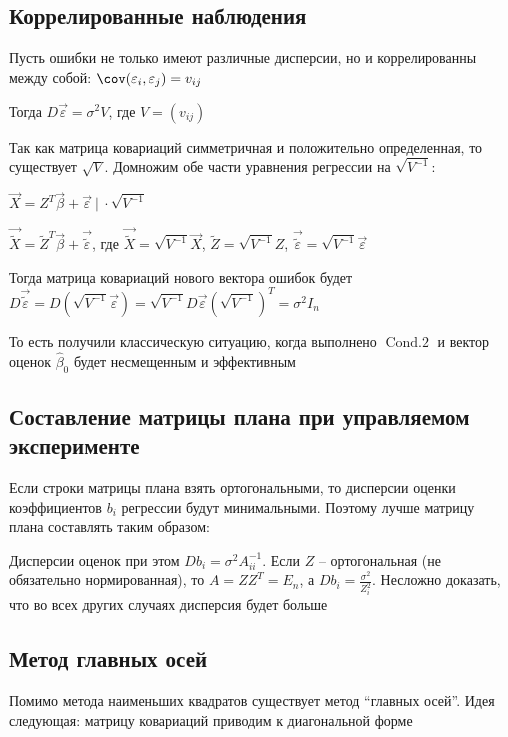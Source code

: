 \subsection{Коррелированные наблюдения}

Пусть ошибки не только имеют различные дисперсии, но и коррелированны между собой: $\cov (\varepsilon_i, \varepsilon_j) = v_{ij}$

Тогда $D \vec \varepsilon = \sigma^2 V$, где $V = \left(v_{ij}\right)$

Так как матрица ковариаций симметричная и положительно определенная, то существует $\sqrt{V}$. Домножим обе части уравнения регрессии на $\sqrt{V^{-1}}$:

$\vec X = Z^T \vec{\beta} + \vec \varepsilon \ \Big| \ \cdot \sqrt{V^{-1}}$

$\vec \tilde{X} = \tilde Z^T \vec \beta + \vec \tilde{\varepsilon}$, где $\vec \tilde{X} = \sqrt{V^{-1}} \vec X$, $\tilde Z = \sqrt{V^{-1}} Z$, $\vec \tilde{\varepsilon} = \sqrt{V^{-1}} \vec \varepsilon$

Тогда матрица ковариаций нового вектора ошибок будет $D \vec \tilde{\varepsilon} = D(\sqrt{V^{-1}} \vec \varepsilon) = \sqrt{V^{-1}} D \vec \varepsilon \left(\sqrt{V^{-1}}\right)^T = \sigma^2 I_n$

То есть получили классическую ситуацию, когда выполнено $\operatorname{Cond. 2}$ и вектор оценок $\hat \beta_0$ будет несмещенным и эффективным

\subsection{Составление матрицы плана при управляемом эксперименте}

Если строки матрицы плана взять ортогональными, то дисперсии оценки коэффициентов $b_i$ регрессии будут минимальными. Поэтому лучше матрицу плана составлять таким образом:

Дисперсии оценок при этом $D b_i = \sigma^2 A^{-1}_{ii}$. Если $Z$ -- ортогональная (не обязательно нормированная), то $A = Z Z^T = E_n$, а $D b_i = \frac{\sigma^2}{Z_i^2}$. Несложно доказать, что во всех других случаях дисперсия будет больше

\subsection{Метод главных осей}

Помимо метода наименьших квадратов существует метод \enquote{главных осей}. Идея следующая: матрицу ковариаций приводим к диагональной форме

